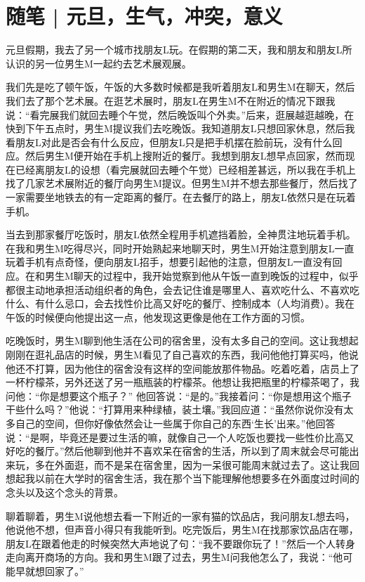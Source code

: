 \chapter{随笔 | 元旦，生气，冲突，意义}



元旦假期，我去了另一个城市找朋友L玩。在假期的第二天，我和朋友和朋友L所认识的另一位男生M一起约去艺术展观展。

我们先是吃了顿午饭，午饭的大多数时候都是我听着朋友L和男生M在聊天，然后我们去了那个艺术展。在逛艺术展时，朋友L在男生M不在附近的情况下跟我说：“看完展我们就回去睡个午觉，然后晚饭叫个外卖。”后来，逛展越逛越晚，在快到下午五点时，男生M提议我们去吃晚饭。我知道朋友L只想回家休息，然后我看朋友L对此是否会有什么反应，但朋友L只是把手机摆在脸前玩，没有什么回应。然后男生M便开始在手机上搜附近的餐厅。我想到朋友L想早点回家，然而现在已经离朋友L的设想（看完展就回去睡个午觉）已经相差甚远，所以我在手机上找了几家艺术展附近的餐厅向男生M提议。但男生M并不想去那些餐厅，然后找了一家需要坐地铁去的有一定距离的餐厅。在去餐厅的路上，朋友L依然只是在玩着手机。

当去到那家餐厅吃饭时，朋友L依然全程用手机遮挡着脸，全神贯注地玩着手机。在我和男生M吃得尽兴，同时开始熟起来地聊天时，男生M开始注意到朋友L一直玩着手机有点奇怪，便向朋友L招手，想要引起他的注意，但朋友L一直没有回应。在和男生M聊天的过程中，我开始觉察到他从午饭一直到晚饭的过程中，似乎都很主动地承担活动组织者的角色，会去记住谁是哪里人、喜欢吃什么、不喜欢吃什么、有什么忌口，会去找性价比高又好吃的餐厅、控制成本（人均消费）。我在午饭的时候便向他提出这一点，他发现这更像是他在工作方面的习惯。

吃晚饭时，男生M聊到他生活在公司的宿舍里，没有太多自己的空间。这让我想起刚刚在逛礼品店的时候，男生M看见了自己喜欢的东西，我问他他打算买吗，他说他还不打算，因为他住的宿舍没有这样的空间能放那件物品。吃着吃着，店员上了一杯柠檬茶，另外还送了另一瓶瓶装的柠檬茶。他想让我把瓶里的柠檬茶喝了，我问他：“你是想要这个瓶子？” 他回答说：“是的。”我接着问：“你是想用这个瓶子干些什么吗？”他说：“打算用来种绿植，装土壤。”我回应道：“虽然你说你没有太多自己的空间，但你好像依然会让一些属于你自己的东西‘生长’出来。”他回答说：“是啊，毕竟还是要过生活的嘛，就像自己一个人吃饭也要找一些性价比高又好吃的餐厅。”然后他聊到他并不喜欢呆在宿舍的生活，所以到了周末就会尽可能出来玩，多在外面逛，而不是呆在宿舍里，因为一呆很可能周末就过去了。这让我回想起我以前在大学时的宿舍生活，我在那个当下能理解他想要多在外面度过时间的念头以及这个念头的背景。

聊着聊着，男生M说他想去看一下附近的一家有猫的饮品店，我问朋友L想去吗，他说他不想，但声音小得只有我能听到。吃完饭后，男生M在找那家饮品店在哪，朋友L在跟着他走的时候突然大声地说了句：“我不要跟你玩了！”然后一个人转身走向离开商场的方向。我和男生M跟了过去，男生M问我他怎么了，我说：“他可能早就想回家了。”

